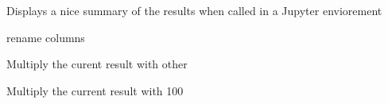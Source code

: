 \documentclass[letterpaper,10pt,english]{sphinxmanual}
\begin{document}
\begin{fulllineitems}
\begin{fulllineitems}
\label{\detokenize{index:modelvis.vis._repr_html_}}
\pysigstartsignatures
{}
\pysigstopsignatures
\sphinxAtStartPar
Displays a nice summary of the results when called in a Jupyter enviorement

\end{fulllineitems}


\begin{fulllineitems}
\label{\detokenize{index:modelvis.vis.rename}}
\pysigstartsignatures
{}
\pysigstopsignatures
\sphinxAtStartPar
rename columns

\end{fulllineitems}


\begin{fulllineitems}
\label{\detokenize{index:modelvis.vis.mul}}
\pysigstartsignatures
{}
\pysigstopsignatures
\sphinxAtStartPar
Multiply the curent result with other

\end{fulllineitems}


\begin{fulllineitems}
\label{\detokenize{index:modelvis.vis.mul100}}
\pysigstartsignatures
{}
\pysigstopsignatures
\sphinxAtStartPar
Multiply the current result with 100

\end{fulllineitems}


\end{fulllineitems}

\end{document}
